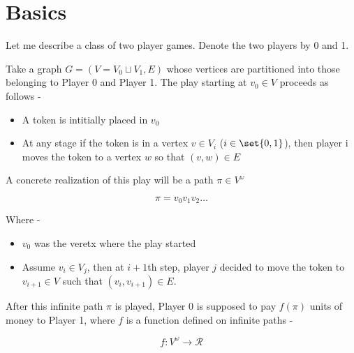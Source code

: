 \chapter{Basics}
Let me describe a class of two player games. Denote the two players by 0 and 1.

Take a graph $G=(V=V_0 \sqcup V_1,E)$ whose vertices are partitioned into those belonging to Player 0 and Player 1.
The play starting at $v_0 \in V$ proceeds as follows -

\begin{itemize}
  \item A token is intitially placed in $v_0$
  \item At any stage if the token is in a vertex $v \in V_i$ ($i \in \set{0,1}$), then
        player i moves the token to a vertex $w$ so that $(v,w) \in E$
\end{itemize}

A concrete realization of this play will be a path $\pi \in V^{\omega}$

\[
  \pi = v_0 v_1 v_2 \ldots
\]

Where -
\begin{itemize}
  \item $v_0$ was the veretx where the play started
  \item Assume $v_i \in V_j$, then at $i+1$th step, player $j$ decided to move the token to $v_{i+1} \in V$ such that $(v_i,v_{i+1}) \in E$.
\end{itemize}

After this infinite path $\pi$ is played, Player 0 is supposed to pay $f(\pi)$ units of money to Player 1, where $f$ is a function defined on infinite paths -

\[
    f : V^{\omega} \to \mathcal{R}
\]
